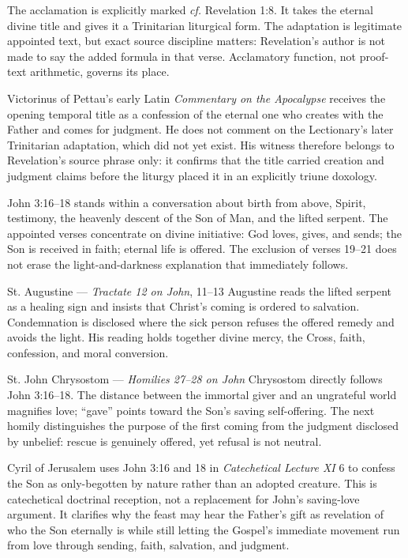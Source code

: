 \begin{deepstudy}
The acclamation is explicitly marked \emph{cf.} Revelation 1:8. It takes the eternal divine title and gives it a Trinitarian liturgical form. The adaptation is legitimate appointed text, but exact source discipline matters: Revelation's author is not made to say the added formula in that verse. Acclamatory function, not proof-text arithmetic, governs its place.

Victorinus of Pettau's early Latin \emph{Commentary on the Apocalypse} receives the opening temporal title as a confession of the eternal one who creates with the Father and comes for judgment. He does not comment on the Lectionary's later Trinitarian adaptation, which did not yet exist. His witness therefore belongs to Revelation's source phrase only: it confirms that the title carried creation and judgment claims before the liturgy placed it in an explicitly triune doxology.

John 3:16--18 stands within a conversation about birth from above, Spirit, testimony, the heavenly descent of the Son of Man, and the lifted serpent. The appointed verses concentrate on divine initiative: God loves, gives, and sends; the Son is received in faith; eternal life is offered. The exclusion of verses 19--21 does not erase the light-and-darkness explanation that immediately follows.

\begin{sourcecard}{St. Augustine --- \emph{Tractate 12 on John}, 11--13}
Augustine reads the lifted serpent as a healing sign and insists that Christ's coming is ordered to salvation. Condemnation is disclosed where the sick person refuses the offered remedy and avoids the light. His reading holds together divine mercy, the Cross, faith, confession, and moral conversion.
\end{sourcecard}

\begin{sourcecard}{St. John Chrysostom --- \emph{Homilies 27--28 on John}}
Chrysostom directly follows John 3:16--18. The distance between the immortal giver and an ungrateful world magnifies love; “gave” points toward the Son's saving self-offering. The next homily distinguishes the purpose of the first coming from the judgment disclosed by unbelief: rescue is genuinely offered, yet refusal is not neutral.
\end{sourcecard}

Cyril of Jerusalem uses John 3:16 and 18 in \emph{Catechetical Lecture XI} 6 to confess the Son as only-begotten by nature rather than an adopted creature. This is catechetical doctrinal reception, not a replacement for John's saving-love argument. It clarifies why the feast may hear the Father's gift as revelation of who the Son eternally is while still letting the Gospel's immediate movement run from love through sending, faith, salvation, and judgment.


\end{deepstudy}
